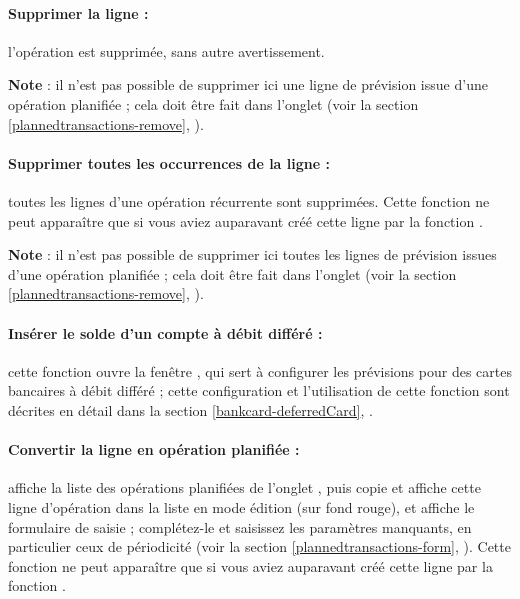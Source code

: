 \paragraph{Supprimer la ligne :}l'opération est supprimée, sans autre avertissement.

\textbf{Note} : il n'est pas possible de supprimer ici une ligne de prévision issue d'une opération planifiée ; cela doit être fait dans l'onglet  (voir la section \ref{plannedtransactions-remove}, ).

\paragraph{Supprimer toutes les occurrences de la ligne :}toutes les lignes d'une opération récurrente sont supprimées.  Cette fonction ne peut apparaître que si vous aviez auparavant créé cette ligne par la fonction . 

\textbf{Note} : il n'est pas possible de supprimer ici toutes les lignes de prévision issues d'une opération planifiée ; cela doit être fait dans l'onglet  (voir la section \ref{plannedtransactions-remove}, ).

\paragraph{Insérer le solde d'un compte à débit différé :}cette fonction ouvre la fenêtre , qui sert à configurer les prévisions pour des cartes bancaires à débit différé ; cette configuration et l'utilisation de cette fonction sont décrites en détail dans la section \ref{bankcard-deferredCard}, .

\paragraph{Convertir la ligne en opération planifiée :}affiche la liste des opérations planifiées de l'onglet , puis copie et affiche cette ligne d'opération dans la liste en mode édition (sur fond rouge{\couleur}), et affiche le formulaire de saisie ; complétez-le et saisissez les paramètres manquants, en particulier ceux de périodicité (voir la section \vref{plannedtransactions-form}, ). Cette fonction ne peut apparaître que si vous aviez auparavant créé cette ligne par la fonction .

